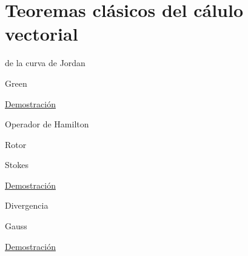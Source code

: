 \documentclass{report}
\begin{document}
\begin{propobox}
\end{propobox}

\chapter{Teoremas clásicos del cálulo vectorial}

\begin{teobox}{de la curva de Jordan}

\end{teobox}


\begin{teobox}{Green}

	\tcblower
	\underline{Demostración} \\
\end{teobox}

\begin{defbox}{Operador de Hamilton}
\end{defbox}

\begin{defbox}{Rotor}
\end{defbox}

\begin{teobox}{Stokes}

	\tcblower
	\underline{Demostración} \\
\end{teobox}

\begin{defbox}{Divergencia}
\end{defbox}

\begin{teobox}{Gauss}

	\tcblower
	\underline{Demostración} \\
\end{teobox}
\end{document}
